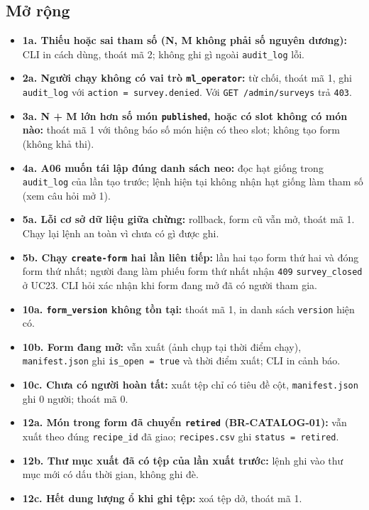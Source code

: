 \subsection{Mở rộng}
\begin{itemize}
\item \textbf{1a. Thiếu hoặc sai tham số (N, M không phải số nguyên dương):} CLI in cách dùng, thoát mã 2; không ghi gì ngoài {\small\texttt{audit\_\allowbreak{}\allowbreak{}log}} lỗi.
\item \textbf{2a. Người chạy không có vai trò {\small\texttt{ml\_\allowbreak{}\allowbreak{}operator}}:} từ chối, thoát mã 1, ghi {\small\texttt{audit\_\allowbreak{}\allowbreak{}log}} với {\small\texttt{action = survey.\allowbreak{}denied}}. Với {\small\texttt{GET /\allowbreak{}\allowbreak{}admin/\allowbreak{}\allowbreak{}surveys}} trả {\small\texttt{403}}.
\item \textbf{3a. N + M lớn hơn số món {\small\texttt{published}}, hoặc có slot không có món nào:} thoát mã 1 với thông báo số món hiện có theo slot; không tạo form (không khả thi).
\item \textbf{4a. A06 muốn tái lập đúng danh sách neo:} đọc hạt giống trong {\small\texttt{audit\_\allowbreak{}\allowbreak{}log}} của lần tạo trước; lệnh hiện tại không nhận hạt giống làm tham số (xem câu hỏi mở 1).
\item \textbf{5a. Lỗi cơ sở dữ liệu giữa chừng:} rollback, form cũ vẫn mở, thoát mã 1. Chạy lại lệnh an toàn vì chưa có gì được ghi.
\item \textbf{5b. Chạy {\small\texttt{create-\allowbreak{}form}} hai lần liên tiếp:} lần hai tạo form thứ hai và đóng form thứ nhất; người đang làm phiếu form thứ nhất nhận {\small\texttt{409}} {\small\texttt{survey\_\allowbreak{}\allowbreak{}closed}} ở UC23. CLI hỏi xác nhận khi form đang mở đã có người tham gia.
\item \textbf{10a. {\small\texttt{form\_\allowbreak{}\allowbreak{}version}} không tồn tại:} thoát mã 1, in danh sách {\small\texttt{version}} hiện có.
\item \textbf{10b. Form đang mở:} vẫn xuất (ảnh chụp tại thời điểm chạy), {\small\texttt{manifest.\allowbreak{}json}} ghi {\small\texttt{is\_\allowbreak{}\allowbreak{}open = true}} và thời điểm xuất; CLI in cảnh báo.
\item \textbf{10c. Chưa có người hoàn tất:} xuất tệp chỉ có tiêu đề cột, {\small\texttt{manifest.\allowbreak{}json}} ghi 0 người; thoát mã 0.
\item \textbf{12a. Món trong form đã chuyển {\small\texttt{retired}} (BR-\allowbreak{}CATALOG-\allowbreak{}01):} vẫn xuất theo đúng {\small\texttt{recipe\_\allowbreak{}\allowbreak{}id}} đã giao; {\small\texttt{recipes.\allowbreak{}csv}} ghi {\small\texttt{status = retired}}.
\item \textbf{12b. Thư mục xuất đã có tệp của lần xuất trước:} lệnh ghi vào thư mục mới có dấu thời gian, không ghi đè.
\item \textbf{12c. Hết dung lượng ổ khi ghi tệp:} xoá tệp dở, thoát mã 1.
\end{itemize}
